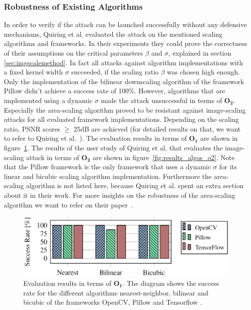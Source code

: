 \documentclass[sigconf]{acmart}
\begin{document}
\subsubsection{Robustness of Existing Algorithms}
In order to verify if the attack can be launched successfully without any defensive mechanisms, Quiring et al. evaluated the attack on the mentioned scaling algorithms and frameworks.
In their experiments they could prove the correctness of their assumptions on the critical parameters $\beta$ and $\sigma$, explained in section \ref{sec:imgscalemethod}. 
In fact all attacks against algorithm implementations with a fixed kernel width $\sigma$ succeeded, if the scaling ratio $\beta$ was chosen high enough.
Only the implementation of the bilinear downscaling algorithm of the framework Pillow didn't achieve a success rate of 100\%.
However, algorithms that are implemented using a dynamic $\sigma$ made the attack unsuccessful in terms of $\boldsymbol{O_2}$.
Especially the area-scaling algorithm proved to be resistant against image-scaling attacks for all evaluated framework implementations.
Depending on the scaling ratio, PSNR scores $\geq$ 25dB are achieved (for detailed results on that, we want to refer to Quiring et al.~\cite{imgscale}).
The evaluation results in terms of $\boldsymbol{O_1}$ are shown in figure~\ref{fig:results_algos_o1}.
The results of the user study of Quiring et al. that evaluates the image-scaling attack in terms of $\boldsymbol{O_2}$ are shown in figure~\ref{fig:results_algos_o2}.
Note that the Pillow framework is the only framework that uses a dynamic $\sigma$ for its linear and bicubic scaling algorithm implementation.
Furthermore the area-scaling algorithm is not listed here, because Quiring et al. spent an extra section about it in their work.
For more insights on the robustness of the area-scaling algorithm we want to refer on their paper~\cite{imgscale}.

\begin{figure}[h]
  \centering
  \includegraphics[width=\linewidth]{img/resO1.png}
  \caption{Evaluation results in terms of $\boldsymbol{O_1}$. The diagram shows the success rate for the different algorithms nearest-neighbor, bilinear and bicubic of the frameworks OpenCV, Pillow and Tensorflow \cite{imgscale}.}
  \Description{}
  \label{fig:results_algos_o1}
\end{figure}
\end{document}
